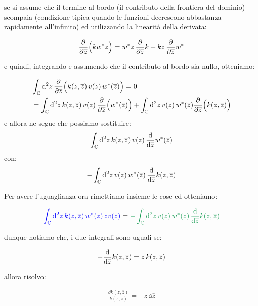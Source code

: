 \begin{itemize}
\begin{myapprf}
	se si assume che il termine al bordo (il contributo della frontiera del dominio) scompaia (condizione tipica quando le funzioni decrescono abbastanza rapidamente all’infinito) ed utilizzando la linearità della derivata:
	
\begin{align*}
	\pdv{\overline{z}}\qty\Big( k w^* z) = w^* z \, \pdv{\overline{z}} k + k z \, \pdv{\overline{z}} w^*
\end{align*}

	e quindi, integrando e assumendo che il contributo al bordo sia nullo, otteniamo:

\begin{align*}	
	&\int_{\mathbb{C}} \dd^2 z  \,\pdv{\overline{z}}\qty\Big( k(z, \overline{z}) \, v(z)\,  w^*(\overline{z})) = 0 \\
	&= \int_{\mathbb{C}} \dd^2 z\, k(z, \overline{z}) \, v(z) \,\pdv{\overline{z}}\qty\Big( w^*(\overline{z})) + \int_{\mathbb{C}} \dd^2 z \, v(z) \,w^*(\overline{z})\pdv{\overline{z}}\qty\Big( k(z, \overline{z}) ) 
\end{align*}	
	e allora ne segue che possiamo sostituire:
\begin{align*}	
	\int_{\mathbb{C}} \dd^2 z  \, k(z, \overline{z}) \, v(z)\,  \dv{\overline{z}} w^*(\overline{z}) 
\end{align*}
	con:
\begin{align*}	
	-\int_{\mathbb{C}} \dd^2 z \,v(z)  \,  w^*(\overline{z}) \, \dv{\overline{z}} k(z, \overline{z})
\end{align*}
\end{myapprf}
\end{itemize}
	
	Per avere l'uguaglianza ora rimettiamo insieme le cose ed otteniamo:
	
\begin{align*}
	\textcolor{blue}{   \int_{\mathbb{C}} \dd^2 z \, k(z, \overline{z}) \, w^*(z) \, zv(z)  } = \textcolor{ForestGreen}{ -\int_{\mathbb{C}} \dd^2 z \,v(z)  \,  w^*(z) \, \dv{\overline{z}} k(z, \overline{z})}
\end{align*}
	
	dunque notiamo che, i due integrali sono uguali se:
	
\begin{align*}
	-\dv{\overline{z}} k\qty(z, \overline{z}) = z \, k(z, \overline{z})
\end{align*}

	allora risolvo:

\begin{align*}
	\frac{\dd k(z, \overline{z})}{k(z, \overline{z})} = - z \, \dd \overline{z}
\end{align*}

